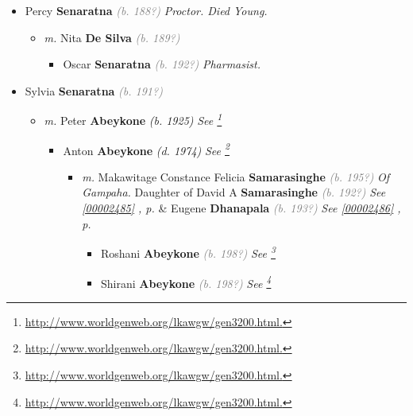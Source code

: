 \documentclass[10pt, openany]{book}
\begin{document}
\begin{itemize}
{\begin{itemize}
{\begin{itemize}
\end{itemize}
 }
\item{Percy \textbf{Senaratna} \textcolor{gray}{\textit{(b. 188?)}} \textcolor{slmaroon}{\textit{Proctor.
Died Young.}}
\begin{itemize}
\item{\textit{m.} Nita \textbf{De Silva} \textcolor{gray}{\textit{(b. 189?)}}   \label{couple:00000158:00000764} \begin{itemize}
\item{Oscar \textbf{Senaratna} \textcolor{gray}{\textit{(b. 192?)}} \textcolor{slmaroon}{\textit{Pharmasist.}}
 }
\end{itemize}}
\end{itemize}
 }
\item{Sylvia \textbf{Senaratna} \textcolor{gray}{\textit{(b. 191?)}}
\begin{itemize}
\item{\textit{m.} Peter \textbf{Abeykone} \textcolor{slorange}{\textit{(b. 1925)}} \textcolor{slmaroon}{\textit{See \footnote{\url{http://www.worldgenweb.org/lkawgw/gen3200.html.}}}}   \label{couple:00000007:00000776} \begin{itemize}
\item{Anton \textbf{Abeykone} \textcolor{slorange}{\textit{(d. 1974)}} \textcolor{slmaroon}{\textit{See \footnote{\url{http://www.worldgenweb.org/lkawgw/gen3200.html.}}}}
\begin{itemize}
\item{\textit{m.} Makawitage Constance Felicia \textbf{Samarasinghe} \textcolor{gray}{\textit{(b. 195?)}} \textcolor{slmaroon}{\textit{Of Gampaha.}} Daughter of  David A \textbf{Samarasinghe} \textcolor{gray}{\textit{(b. 192?)}} \textcolor{slteal}{\textit{See  \autoref{00002485} \textit{, p. \pageref{00002485} }}}  \&  Eugene \textbf{Dhanapala} \textcolor{gray}{\textit{(b. 193?)}} \textcolor{slteal}{\textit{See  \autoref{00002486} \textit{, p. \pageref{00002486} }}}   \label{couple:00000001:00000691} \begin{itemize}
\item{Roshani \textbf{Abeykone} \textcolor{gray}{\textit{(b. 198?)}} \textcolor{slmaroon}{\textit{See \footnote{\url{http://www.worldgenweb.org/lkawgw/gen3200.html.}}}}
 }
\item{Shirani \textbf{Abeykone} \textcolor{gray}{\textit{(b. 198?)}} \textcolor{slmaroon}{\textit{See \footnote{\url{http://www.worldgenweb.org/lkawgw/gen3200.html.}}}}
}
\end{itemize}}
\end{itemize}}
\end{itemize}}
\end{itemize}}
\end{itemize}}
\end{itemize}
\end{document}
